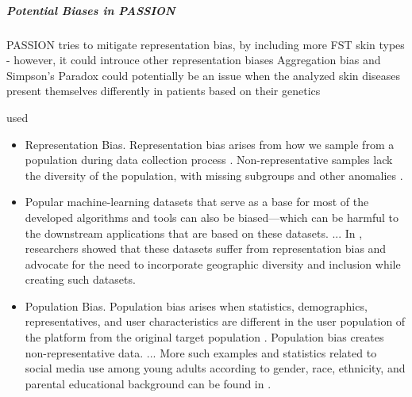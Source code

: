 \documentclass[12pt, a4paper, oneside]{book}   	%
\newif\ifrawcitationactive
\newcommand{\rawcitationstart}{
	\color{purple}\rawcitationactivetrue
}
\newcommand{\rawcitationusedstart}{\color{violet}}
\begin{document}
				
				\subparagraph{Potential Biases in PASSION}
				PASSION tries to mitigate representation bias, by including more FST skin types - however, it could introuce other representation biases
				Aggregation bias and Simpson's Paradox could potentially be an issue when the analyzed skin diseases present themselves differently in patients based on their genetics
				
				
				\rawcitationstart
				used
				\begin{itemize}		
					\rawcitationusedstart
					\item Representation Bias. Representation bias arises from how we sample from a population during data collection process \autocite{M144_Suresh_2021}. Non-representative samples lack the diversity of the population, with missing subgroups and other anomalies \autocite{Mehrabi_2021}.
					\item Popular machine-learning datasets that serve as a base for most of the developed algorithms and tools can also be biased—which can be harmful to the downstream applications that are based on these datasets. ... In \autocite{M142_Shankar_2017}, researchers showed that these datasets suffer from representation bias and advocate for the need to incorporate geographic diversity and inclusion while creating such datasets. \autocite{Mehrabi_2021}
				
					\item Population Bias. Population bias arises when statistics, demographics, representatives, and user characteristics are different in the user population of the platform from the original target population \autocite{M120_Olteanu_2019}. Population bias creates non-representative data. ... More such examples and statistics related to social media use among young adults according to gender, race, ethnicity, and parental educational background can be found in \autocite{M64_Hargittai_2007}. \autocite{Mehrabi_2021}
				

\end{itemize}
\end{document}
